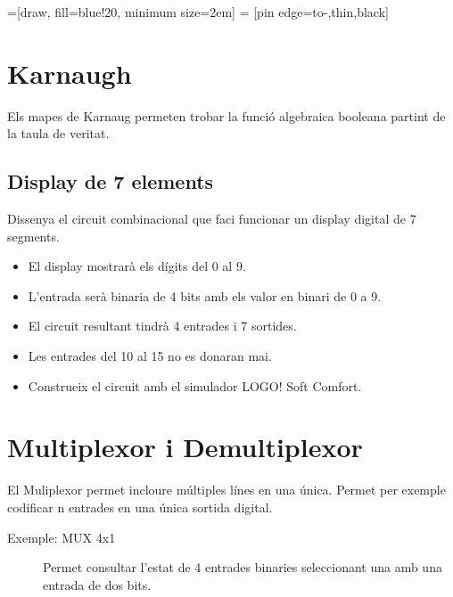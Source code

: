 \documentclass[a4paper]{article}
\begin{document}
=[draw, fill=blue!20, minimum size=2em]
 = [pin edge={to-,thin,black}]


\section{Karnaugh}
\label{sec:introduction}

Els mapes de Karnaug permeten trobar la funci\'o algebraica booleana partint de la taula de veritat.

\subsection{Display de 7 elements}
Dissenya el circuit combinacional que faci funcionar un display digital de 7 segments.
\begin{itemize}
\item El display mostrar\`a els d\'igits del 0 al 9.
\item L'entrada ser\`a binaria de 4 bits amb els valor en binari de 0 a 9.
\item El circuit resultant tindr\`a 4 entrades i 7 sortides.
\item Les entrades del 10 al 15 no es donaran mai. 
\item Construeix el circuit amb el simulador LOGO! Soft Comfort.
\end{itemize}

\section{Multiplexor i Demultiplexor}
El Muliplexor permet incloure múltiples línes en una única. Permet per exemple codificar n entrades en una única sortida digital.

\begin{description}
\item[Exemple: MUX 4x1] Permet consultar l'estat de 4 entrades binaries seleccionant una amb una entrada de dos bits.
\end{description}
\end{document}
